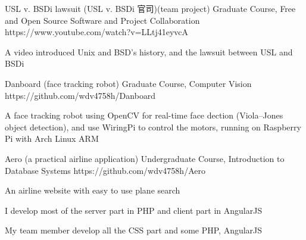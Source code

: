 
\begin{cvopensources}

  \cvopensource
    {USL v. BSDi lawsuit (USL v. BSDi 官司)(team project)}   %
    {Graduate Course, Free and Open Source Software and Project Collaboration}  %
    {https://www.youtube.com/watch?v=LLtj41eyvcA}
    {
      \begin{cvitems}   %
        \item {A video introduced Unix and BSD's history, and the lawsuit between USL and BSDi}
      \end{cvitems}
    }

  \cvopensource
    {Danboard (face tracking robot)}   %
    {Graduate Course, Computer Vision}  %
    {https://github.com/wdv4758h/Danboard}
    {
      \begin{cvitems}   %
        \item {A face tracking robot using OpenCV for real-time face dection (Viola–Jones object detection), and use WiringPi to control the motors, running on Raspberry Pi with Arch Linux ARM}
      \end{cvitems}
    }

  \cvopensource
    {Aero (a practical airline application)}   %
    {Undergraduate Course, Introduction to Database Systems}  %
    {https://github.com/wdv4758h/Aero}
    {
      \begin{cvitems}   %
        \item {An airline website with easy to use plane search}
        \item {I develop most of the server part in PHP and client part in AngularJS}
        \item {My team member develop all the CSS part and some PHP, AngularJS}
      \end{cvitems}
    }


\end{cvopensources}
